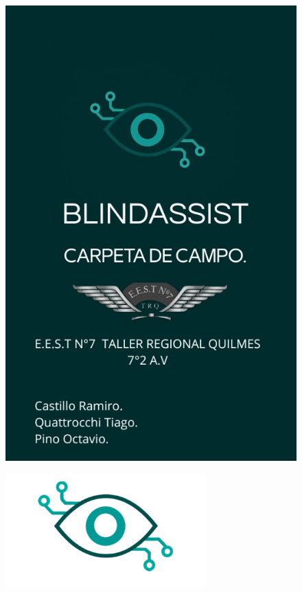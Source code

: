 \documentclass[12pt,a4paper]{article}
\begin{document}
\clearpage
{}
\thispagestyle{empty}
\begin{figure}[!t]
    \centering
    \includegraphics[width=\paperwidth,height=\paperheight]{Carpeta de campo/caratula campo.jpg}
\end{figure}
\restoregeometry
\clearpage
\setcounter{page}{1}
\tableofcontents
\begin{figure}[h]
    \centering %
    \includegraphics[width=0.7\linewidth]{Carpeta de campo/logo indice.png} %
\end{figure}
\newpage
\end{document}
